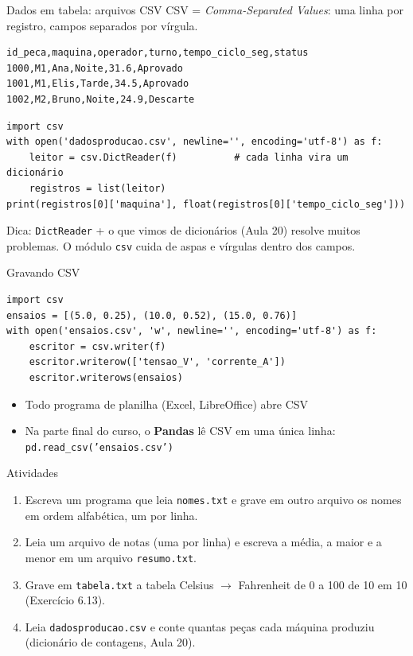 \documentclass[aspectratio=169,10pt,t]{beamer}
\begin{document}
\begin{frame}[fragile]{Dados em tabela: arquivos CSV}
  CSV = \emph{Comma-Separated Values}: uma linha por registro, campos separados por vírgula.
\begin{lstlisting}[style=saida]
id_peca,maquina,operador,turno,tempo_ciclo_seg,status
1000,M1,Ana,Noite,31.6,Aprovado
1001,M1,Elis,Tarde,34.5,Aprovado
1002,M2,Bruno,Noite,24.9,Descarte
\end{lstlisting}
\begin{lstlisting}
import csv
with open('dadosproducao.csv', newline='', encoding='utf-8') as f:
    leitor = csv.DictReader(f)          # cada linha vira um dicionário
    registros = list(leitor)
print(registros[0]['maquina'], float(registros[0]['tempo_ciclo_seg']))
\end{lstlisting}
  \small Dica: \texttt{DictReader} + o que vimos de dicionários (Aula 20) resolve muitos problemas. O módulo \texttt{csv} cuida de aspas e vírgulas dentro dos campos.\\
\end{frame}

\begin{frame}[fragile]{Gravando CSV}
\begin{lstlisting}
import csv
ensaios = [(5.0, 0.25), (10.0, 0.52), (15.0, 0.76)]
with open('ensaios.csv', 'w', newline='', encoding='utf-8') as f:
    escritor = csv.writer(f)
    escritor.writerow(['tensao_V', 'corrente_A'])
    escritor.writerows(ensaios)
\end{lstlisting}
  \begin{itemize}
    \item Todo programa de planilha (Excel, LibreOffice) abre CSV
    \item Na parte final do curso, o \textbf{Pandas} lê CSV em uma única linha: \texttt{pd.read\_csv('ensaios.csv')}
  \end{itemize}
\end{frame}

\begin{frame}{Atividades}
  \begin{enumerate}
    \item Escreva um programa que leia \texttt{nomes.txt} e grave em outro arquivo os nomes em ordem alfabética, um por linha.
    \item Leia um arquivo de notas (uma por linha) e escreva a média, a maior e a menor em um arquivo \texttt{resumo.txt}.
    \item Grave em \texttt{tabela.txt} a tabela Celsius \(\to\) Fahrenheit de 0 a 100 de 10 em 10 (Exercício 6.13).
    \item Leia \texttt{dadosproducao.csv} e conte quantas peças cada máquina produziu (dicionário de contagens, Aula 20).
  \end{enumerate}
\end{frame}
\end{document}

